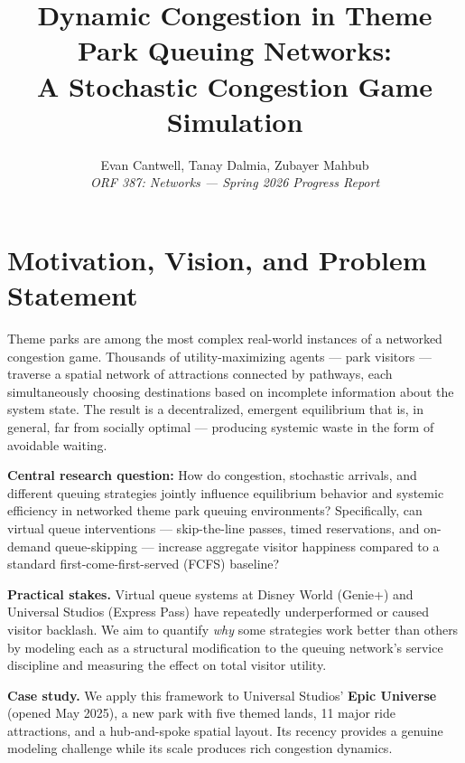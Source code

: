 \documentclass[11pt]{article}
\title{\textbf{Dynamic Congestion in Theme Park Queuing Networks:\\ A Stochastic Congestion Game Simulation}}
\author{Evan Cantwell, Tanay Dalmia, Zubayer Mahbub\\[4pt]\textit{ORF 387: Networks --- Spring 2026 Progress Report}}
\date{}
\begin{document}
\maketitle

\section{Motivation, Vision, and Problem Statement}

Theme parks are among the most complex real-world instances of a networked congestion game. Thousands of utility-maximizing agents --- park visitors --- traverse a spatial network of attractions connected by pathways, each simultaneously choosing destinations based on incomplete information about the system state. The result is a decentralized, emergent equilibrium that is, in general, far from socially optimal --- producing systemic waste in the form of avoidable waiting.

\textbf{Central research question:} How do congestion, stochastic arrivals, and different queuing strategies jointly influence equilibrium behavior and systemic efficiency in networked theme park queuing environments? Specifically, can virtual queue interventions --- skip-the-line passes, timed reservations, and on-demand queue-skipping --- increase aggregate visitor happiness compared to a standard first-come-first-served (FCFS) baseline?

\textbf{Practical stakes.} Virtual queue systems at Disney World (Genie+) and Universal Studios (Express Pass) have repeatedly underperformed or caused visitor backlash. We aim to quantify \emph{why} some strategies work better than others by modeling each as a structural modification to the queuing network's service discipline and measuring the effect on total visitor utility.

\textbf{Case study.} We apply this framework to Universal Studios' \textbf{Epic Universe} (opened May 2025), a new park with five themed lands, 11 major ride attractions, and a hub-and-spoke spatial layout. Its recency provides a genuine modeling challenge while its scale produces rich congestion dynamics.
\end{document}
